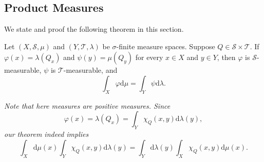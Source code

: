 \subsection{Product Measures}
We state and proof the following theorem in this section.
\begin{theorem}
Let $(X,\mathscr{S},\mu)$ and $(Y,\mathscr{T},\lambda)$ be $\sigma$-finite measure spaces. Suppose $Q\in\mathscr{S}\times\mathscr{T}$. If $\varphi(x)=\lambda(Q_x)$ and $\psi(y)=\mu(Q_y)$ for every $x\in X$ and $y\in Y$, then $\varphi$ is $\mathscr{S}$-measurable, $\psi$ is $\mathscr{T}$-measurable, and 
$$
\int_X{\varphi \mathrm{d}\mu}=\int_Y{\psi \mathrm{d}\lambda}.
$$
\end{theorem}
\begin{note}\em
Note that here measures are positive measures. Since 
$$
\varphi \left( x \right) =\lambda \left( Q_x \right) =\int_Y{\chi _Q\left( x,y \right) \mathrm{d}\lambda \left( y \right)},
$$
our theorem indeed implies 
$$
\int_X{\mathrm{d}\mu \left( x \right) \int_Y{\chi _Q\left( x,y \right) \mathrm{d}\lambda \left( y \right)}}=\int_Y{\mathrm{d}\lambda \left( y \right) \int_X{\chi _Q\left( x,y \right) \mathrm{d}\mu \left( x \right)}}.
$$
\end{note}
